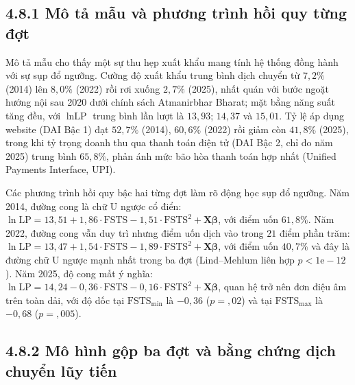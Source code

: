 \documentclass[
  a4paper,
  13pt]{extreport}
\begin{document}
\hypertarget{muxf4-tux1ea3-mux1eabu-vuxe0-phux1b0ux1a1ng-truxecnh-hux1ed3i-quy-tux1eebng-ux111ux1ee3t}{%
\subsection{4.8.1 Mô tả mẫu và phương trình hồi quy từng
đợt}\label{muxf4-tux1ea3-mux1eabu-vuxe0-phux1b0ux1a1ng-truxecnh-hux1ed3i-quy-tux1eebng-ux111ux1ee3t}}

Mô tả mẫu cho thấy một sự thu hẹp xuất khẩu mang tính hệ thống đồng hành
với sự sụp đổ ngưỡng. Cường độ xuất khẩu trung bình dịch chuyển từ
\(7{,}2\%\) (2014) lên \(8{,}0\%\) (2022) rồi rơi xuống \(2{,}7\%\)
(2025), nhất quán với bước ngoặt hướng nội sau 2020 dưới chính sách
Atmanirbhar Bharat; mặt bằng năng suất tăng đều, với \(\ln\text{LP}\)
trung bình lần lượt là \(13{,}93\); \(14{,}37\) và \(15{,}01\). Tỷ lệ áp
dụng website (DAI Bậc 1) đạt \(52{,}7\%\) (2014), \(60{,}6\%\) (2022)
rồi giảm còn \(41{,}8\%\) (2025), trong khi tỷ trọng doanh thu qua thanh
toán điện tử (DAI Bậc 2, chỉ đo năm 2025) trung bình \(65{,}8\%\), phản
ánh mức bão hòa thanh toán hợp nhất (Unified Payments Interface, UPI).

Các phương trình hồi quy bậc hai từng đợt làm rõ động học sụp đổ ngưỡng.
Năm 2014, đường cong là chữ U ngược cổ điển:
\(\ln\text{LP} = 13{,}51 + 1{,}86 \cdot \text{FSTS} - 1{,}51 \cdot \text{FSTS}^2 + \mathbf{X}\boldsymbol{\beta}\),
với điểm uốn \(61{,}8\%\). Năm 2022, đường cong vẫn duy trì nhưng điểm
uốn dịch vào trong \(21\) điểm phần trăm:
\(\ln\text{LP} = 13{,}47 + 1{,}54 \cdot \text{FSTS} - 1{,}89 \cdot \text{FSTS}^2 + \mathbf{X}\boldsymbol{\beta}\),
với điểm uốn \(40{,}7\%\) và đây là đường chữ U ngược mạnh nhất trong ba
đợt (Lind--Mehlum liên hợp \(p < 1\mathrm{e}{-}12\)). Năm 2025, độ cong
mất ý nghĩa:
\(\ln\text{LP} = 14{,}24 - 0{,}36 \cdot \text{FSTS} - 0{,}16 \cdot \text{FSTS}^2 + \mathbf{X}\boldsymbol{\beta}\),
quan hệ trở nên đơn điệu âm trên toàn dải, với độ dốc tại
\(\text{FSTS}_{\min}\) là \(-0{,}36\) (\(p = {,}02\)) và tại
\(\text{FSTS}_{\max}\) là \(-0{,}68\) (\(p = {,}005\)).

\hypertarget{muxf4-huxecnh-gux1ed9p-ba-ux111ux1ee3t-vuxe0-bux1eb1ng-chux1ee9ng-dux1ecbch-chuyux1ec3n-lux169y-tiux1ebfn}{%
\subsection{4.8.2 Mô hình gộp ba đợt và bằng chứng dịch chuyển lũy
tiến}\label{muxf4-huxecnh-gux1ed9p-ba-ux111ux1ee3t-vuxe0-bux1eb1ng-chux1ee9ng-dux1ecbch-chuyux1ec3n-lux169y-tiux1ebfn}}
\end{document}
